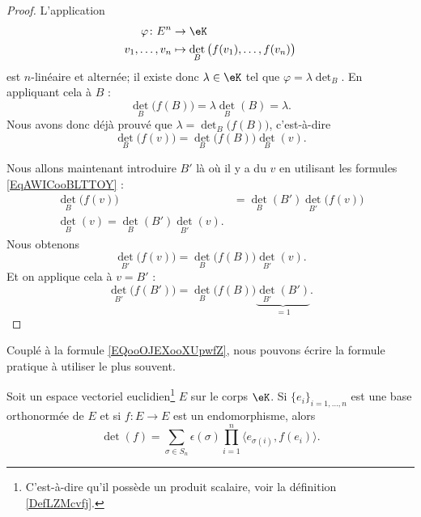 \begin{proof}
    L'application
    \begin{equation}
        \begin{aligned}
            \varphi\colon E^n&\to \eK \\
            v_1,\ldots, v_n&\mapsto \det_B\big( f(v_1),\ldots, f(v_n) \big)
        \end{aligned}
    \end{equation}
    est \( n\)-linéaire et alternée; il existe donc \( \lambda\in \eK\) tel que \( \varphi=\lambda\det_B\). En appliquant cela à \( B\) :
    \begin{equation}
        \det_B\big( f(B) \big)=\lambda \det_B(B)=\lambda.
    \end{equation}
    Nous avons donc déjà prouvé que \( \lambda=\det_B\big( f(B) \big)\), c'est-à-dire
    \begin{equation}
        \det_B\big( f(v) \big)=\det_B\big( f(B) \big)\det_B(v).
    \end{equation}

    Nous allons maintenant introduire \( B'\) là où il y a du \( v\) en utilisant les formules \eqref{EqAWICooBLTTOY} :
    \begin{subequations}
        \begin{align}
            \det_B\big( f(v) \big)&=\det_B(B')\det_{B'}\big( f(v) \big)\\
            \det_B(v)=\det_B(B')\det_{B'}(v).
        \end{align}
    \end{subequations}
    Nous obtenons
    \begin{equation}
        \det_{B'}\big( f(v) \big)=\det_B\big( f(B) \big)\det_{B'}(v).
    \end{equation}
    Et on applique cela à \( v=B'\) :
    \begin{equation}
        \det_{B'}\big( f(B') \big)=\det_B\big( f(B) \big)\underbrace{\det_{B'}(B')}_{=1}.
    \end{equation}
\end{proof}

Couplé à la formule \eqref{EQooOJEXooXUpwfZ}, nous pouvons écrire la formule pratique à utiliser le plus souvent. 

\begin{lemma}       \label{LEMooEZFIooXyYybe}
    Soit un espace vectoriel euclidien\footnote{C'est-à-dire qu'il possède un produit scalaire, voir la définition \ref{DefLZMcvfj}.} \( E\) sur le corps \( \eK\). Si \( \{ e_i \}_{i=1,\ldots, n}\) est une base orthonormée de \( E\) et si \( f\colon E\to E\) est un endomorphisme, alors
    \begin{equation}        \label{EQooQAZLooZutFUz}
        \det(f)=\sum_{\sigma\in S_n}\epsilon(\sigma)\prod_{i=1}^n\langle e_{\sigma(i)}, f(e_i)\rangle.
    \end{equation}
\end{lemma}

